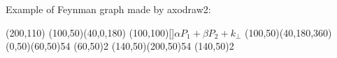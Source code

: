 \documentclass{article}
\begin{document}
Example of Feynman graph made by axodraw2:
\begin{center}
  \begin{axopicture}(200,110)
    \Arc[arrow](100,50)(40,0,180)
    \Text(100,100)[]{$\alpha P_1 + \beta P_2 + k_\perp$}
    \Arc[arrow](100,50)(40,180,360)
    \Gluon(0,50)(60,50){5}{4}
    \Vertex(60,50){2} 
    \Gluon(140,50)(200,50){5}{4}
    \Vertex(140,50){2}
  \end{axopicture}
\end{center}
\end{document}
